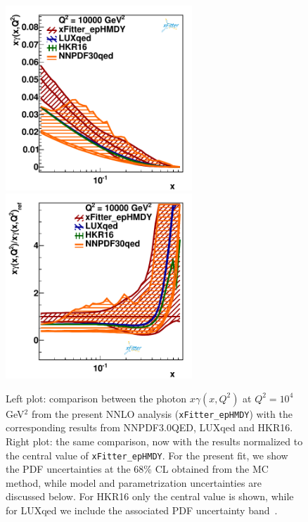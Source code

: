 \begin{figure}[t]
  \includegraphics[width=7cm]{figs/photon_comp_10000.pdf}
  \includegraphics[width=7cm]{figs/photon_comp_10000_ratio.pdf} 
  \caption{Left plot: comparison between the photon $x\gamma(x,Q^2)$ at $Q^2=10^4$ GeV$^2$
    from the present NNLO analysis ({\tt xFitter\_epHMDY}) with the
    corresponding results from NNPDF3.0QED, LUXqed and HKR16.
  Right plot: the same comparison, now with the results normalized to the central value
  of {\tt xFitter\_epHMDY}.
  For the present fit, we show the PDF uncertainties at the 68\% CL obtained from the MC method,
  while model and parametrization uncertainties are discussed below.
  For HKR16 only the central value is shown, while for LUXqed we include
  the associated PDF uncertainty band~\cite{Manohar:2016nzj}. }
\label{photon_zoom} \label{photon_zoom_ratio}
\end{figure}

